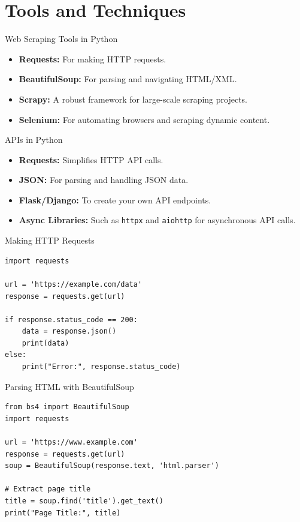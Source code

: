 \documentclass[10pt]{beamer}
\begin{document}
\section{Tools and Techniques}
\begin{frame}[fragile]{Web Scraping Tools in Python}
    \begin{itemize}
        \item \textbf{Requests:} For making HTTP requests.
        \item \textbf{BeautifulSoup:} For parsing and navigating HTML/XML.
        \item \textbf{Scrapy:} A robust framework for large-scale scraping projects.
        \item \textbf{Selenium:} For automating browsers and scraping dynamic content.
    \end{itemize}
\end{frame}

\begin{frame}[fragile]{APIs in Python}
    \begin{itemize}
        \item \textbf{Requests:} Simplifies HTTP API calls.
        \item \textbf{JSON:} For parsing and handling JSON data.
        \item \textbf{Flask/Django:} To create your own API endpoints.
        \item \textbf{Async Libraries:} Such as \texttt{httpx} and \texttt{aiohttp} for asynchronous API calls.
    \end{itemize}
\end{frame}

\begin{frame}[fragile]{Making HTTP Requests}
    \begin{verbatim}
import requests

url = 'https://example.com/data'
response = requests.get(url)

if response.status_code == 200:
    data = response.json()
    print(data)
else:
    print("Error:", response.status_code)
    \end{verbatim}
\end{frame}

\begin{frame}[fragile]{Parsing HTML with BeautifulSoup}
    \begin{verbatim}
from bs4 import BeautifulSoup
import requests

url = 'https://www.example.com'
response = requests.get(url)
soup = BeautifulSoup(response.text, 'html.parser')

# Extract page title
title = soup.find('title').get_text()
print("Page Title:", title)
    \end{verbatim}
\end{frame}
\end{document}
